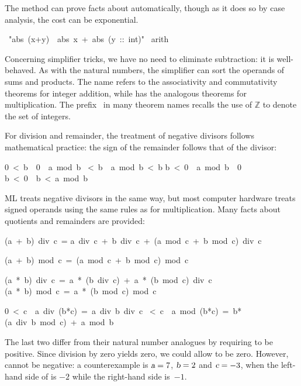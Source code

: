 The  method can prove facts about  automatically, 
though as it does so by case analysis, the cost can be exponential.
\begin{isabelle}
\ "abs\ (x+y)\ \isasymle \ abs\ x\ +\ abs\ (y\ ::\ int)"\isanewline
{}\ arith
\end{isabelle}

Concerning simplifier tricks, we have no need to eliminate subtraction: it
is well-behaved.  As with the natural numbers, the simplifier can sort the
operands of sums and products.  The name 
refers to the
associativity and commutativity theorems for integer addition, while
has the analogous theorems for multiplication.  The
prefix~ in many theorem names recalls the use of $\mathbb{Z}$ to
denote the set of integers.

For division and remainder,
the treatment of negative divisors follows
mathematical practice: the sign of the remainder follows that
of the divisor:
\begin{isabelle}
0\ <\ b\ \isasymLongrightarrow \ 0\ \isasymle \ a\ mod\ b%
\ <\ b\ \isasymLongrightarrow \ a\ mod\ b\ <\ b%
\isanewline
b\ <\ 0\ \isasymLongrightarrow \ a\ mod\ b\ \isasymle \ 0
\isanewline
b\ <\ 0\ \isasymLongrightarrow \ b\ <\ a\ mod\ b%
\end{isabelle}
ML treats negative divisors in the same way, but most computer hardware
treats signed operands using the same rules as for multiplication.
Many facts about quotients and remainders are provided:
\begin{isabelle}
(a\ +\ b)\ div\ c\ =\isanewline
a\ div\ c\ +\ b\ div\ c\ +\ (a\ mod\ c\ +\ b\ mod\ c)\ div\ c%
\par\smallskip
(a\ +\ b)\ mod\ c\ =\ (a\ mod\ c\ +\ b\ mod\ c)\ mod\ c%
\end{isabelle}

\begin{isabelle}
(a\ *\ b)\ div\ c\ =\ a\ *\ (b\ div\ c)\ +\ a\ *\ (b\ mod\ c)\ div\ c%
\isanewline
(a\ *\ b)\ mod\ c\ =\ a\ *\ (b\ mod\ c)\ mod\ c%
\end{isabelle}

\begin{isabelle}
0\ <\ c\ \isasymLongrightarrow \ a\ div\ (b*c)\ =\ a\ div\ b\ div\ c%
\ <\ c\ \isasymLongrightarrow \ a\ mod\ (b*c)\ =\ b*(a\ div\ b\ mod\
c)\ +\ a\ mod\ b%
\end{isabelle}
The last two differ from their natural number analogues by requiring
 to be positive.  Since division by zero yields zero, we could allow
\isa{c} to be zero.  However, \isa{c} cannot be negative: a counterexample
is
$\emph{\sl a} = 7$, $\emph{\sl b} = 2$ and $\emph{\sl c} = -3$, when the left-hand side of
\isa{zdiv_zmult2_eq} is $-2$ while the right-hand side is~$-1$.%
\index{integers|)}\index{*int (type)|)}

